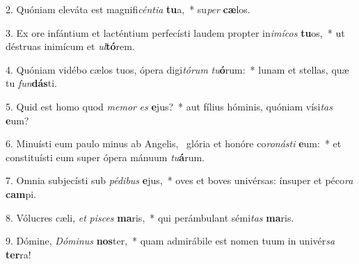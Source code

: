 2. Quóniam eleváta est magnifi\textit{cén}\textit{ti}\textit{a} \textbf{tu}a,~*  su\textit{per} \textbf{cæ}los.\

3. Ex ore infántium et lacténtium perfecísti laudem propter in\textit{i}\textit{mí}\textit{cos} \textbf{tu}os,~*  ut déstruas inimícum et \textit{ul}\textbf{tó}rem.\

4. Quóniam vidébo cælos tuos, ópera digi\textit{tó}\textit{rum} \textit{tu}\textbf{ó}rum:~*  lunam et stellas, quæ tu \textit{fun}\textbf{dás}ti.\

5. Quid est homo quod \textit{me}\textit{mor} \textit{es} \textbf{e}jus?~*  aut fílius hóminis, quóniam vísi\textit{tas} \textbf{e}um?\

6. Minuísti eum paulo minus ab Angelis, \dag\  glória et honóre co\textit{ro}\textit{nás}\textit{ti} \textbf{e}um:~*  et constituísti eum super ópera mánuum \textit{tu}\textbf{á}rum.\

7. Omnia subjecísti sub \textit{pé}\textit{di}\textit{bus} \textbf{e}jus,~*  oves et boves univérsas: ínsuper et péco\textit{ra} \textbf{cam}pi.\

8. Vólucres cæli, \textit{et} \textit{pi}\textit{sces} \textbf{ma}ris,~*  qui perámbulant sémi\textit{tas} \textbf{ma}ris.\

9. Dómine, \textit{Dó}\textit{mi}\textit{nus} \textbf{nos}ter,~*  quam admirábile est nomen tuum in univér\textit{sa} \textbf{ter}ra!\

